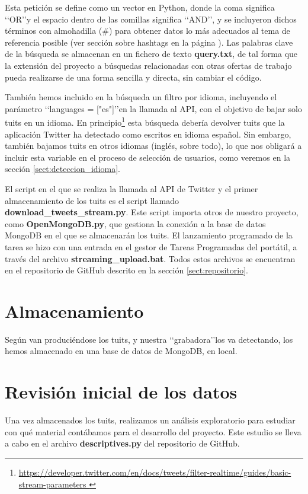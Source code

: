 Esta petición se define como un vector en Python, donde la coma significa \lq\lq OR\rq\rq y el espacio
dentro de las comillas significa \lq\lq AND\rq\rq, y se incluyeron dichos términos con almohadilla 
(\#) para obtener datos lo más adecuados al tema de referencia posible
(ver sección sobre hashtags en la página \pageref{sect:hashtags}). Las palabras clave de la búsqueda se almacenan en un fichero de texto {\bf query.txt},
de tal forma que la extensión del proyecto a búsquedas relacionadas con otras ofertas de trabajo
pueda realizarse de una forma sencilla y directa, sin cambiar el código.

También hemos incluido en la búsqueda un filtro por idioma, incluyendo el parámetro 
\lq\lq languages = ["es"]\rq\rq en la llamada al API, con el objetivo de bajar solo tuits
en un idioma. En principio\footnote{\url{https://developer.twitter.com/en/docs/tweets/filter-realtime/guides/basic-stream-parameters }}
esta búsqueda debería devolver tuits que la aplicación Twitter ha detectado como escritos en
idioma español. Sin embargo, también bajamos tuits en otros idiomas (inglés, sobre todo), lo que
nos obligará a incluir esta variable en el proceso de selección de usuarios, como veremos en la sección 
\ref{sect:deteccion_idioma}.

El script en el que se realiza la llamada al API de Twitter y el primer almacenamiento de los tuits
es el script llamado {\bf download\_tweets\_stream.py}. Este script importa otros
de nuestro proyecto, como {\bf OpenMongoDB.py}, que gestiona la conexión a la base de datos MongoDB
en el que se almacenarán los tuits. El lanzamiento programado de la tarea se hizo con una entrada en el gestor
de Tareas Programadas del portátil, a través del archivo {\bf streaming\_upload.bat}. Todos estos
archivos se encuentran en el repositorio de GitHub descrito en la sección \ref{sect:repositorio}.


\section{Almacenamiento}
Según van produciéndose los tuits, y nuestra \lq\lq grabadora\rq\rq los va detectando, los hemos almacenado
en una base de datos de MongoDB, en local.


\section{Revisión inicial de los datos}
Una vez almacenados los tuits, realizamos un análisis exploratorio para estudiar con qué material contábamos para el desarrollo del proyecto. Este estudio se lleva a cabo en el archivo {\bf descriptives.py} del repositorio de
GitHub.

